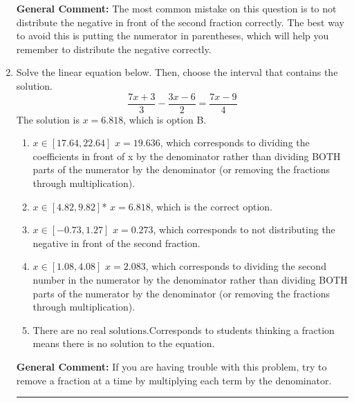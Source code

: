 \documentclass{extbook}[14pt]
\newcommand{\litem}[1]{\item#1\hspace*{-1cm}\rule{\textwidth}{0.4pt}}
\begin{document}
\begin{enumerate}
{\textbf{General Comment:} The most common mistake on this question is to not distribute the negative in front of the second fraction correctly. The best way to avoid this is putting the numerator in parentheses, which will help you remember to distribute the negative correctly.
}
\litem{
Solve the linear equation below. Then, choose the interval that contains the solution.
\[ \frac{7x + 3}{3} - \frac{3x -6}{2} = \frac{7x -9}{4} \]
The solution is \( x = 6.818 \), which is option B.\begin{enumerate}[label=\Alph*.]
\item \( x \in [17.64, 22.64] \) $x = 19.636$, which corresponds to dividing the coefficients in front of x by the denominator rather than dividing BOTH parts of the numerator by the denominator (or removing the fractions through multiplication).
\item \( x \in [4.82, 9.82] \)* $x = 6.818$, which is the correct option.
\item \( x \in [-0.73, 1.27] \) $x = 0.273$, which corresponds to not distributing the negative in front of the second fraction.
\item \( x \in [1.08, 4.08] \) $x = 2.083$, which corresponds to dividing the second number in the numerator by the denominator rather than dividing BOTH parts of the numerator by the denominator (or removing the fractions through multiplication).
\item \( \text{There are no real solutions.} \)Corresponds to students thinking a fraction means there is no solution to the equation.
\end{enumerate}

\textbf{General Comment:} If you are having trouble with this problem, try to remove a fraction at a time by multiplying each term by the denominator.
}
\end{enumerate}
\end{document}
